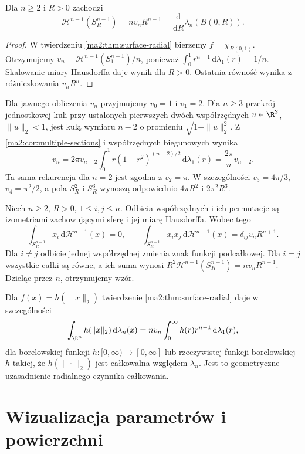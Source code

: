 \begin{wniosek}
\label{ma2:cor:surface-hypersphere}
Dla $n\ge2$ i $R>0$ zachodzi
\[
 \mathcal H^{n-1}(S_R^{n-1})=nv_nR^{n-1}
 =\frac{\mathrm d}{\mathrm dR}\lambda_n(B(0,R)).
\]
\end{wniosek}
\begin{proof}
W twierdzeniu \ref{ma2:thm:surface-radial}
bierzemy $f=\chi_{B(0,1)}$. Otrzymujemy
$v_n=\mathcal H^{n-1}(S_1^{n-1})/n$,
ponieważ $\int_0^1r^{n-1}\,\mathrm d\lambda_1(r)=1/n$.
Skalowanie miary Hausdorffa daje wynik dla $R>0$.
Ostatnia równość wynika z różniczkowania $v_nR^n$.
\end{proof}

Dla jawnego obliczenia $v_n$ przyjmujemy $v_0=1$
i $v_1=2$. Dla $n\ge3$ przekrój jednostkowej kuli
przy ustalonych pierwszych dwóch współrzędnych
$u\in\R^2$, $\|u\|_2<1$, jest kulą wymiaru $n-2$
o promieniu $\sqrt{1-\|u\|_2^2}$.
Z \ref{ma2:cor:multiple-sections} i współrzędnych
biegunowych wynika
\[
 v_n=2\pi v_{n-2}\int_0^1 r(1-r^2)^{(n-2)/2}
 \,\mathrm d\lambda_1(r)=\frac{2\pi}{n}v_{n-2}.
\]
Ta sama rekurencja dla $n=2$ jest zgodna z $v_2=\pi$.
W szczególności $v_3=4\pi/3$, $v_4=\pi^2/2$,
a pola $S_R^2$ i $S_R^3$ wynoszą odpowiednio
$4\pi R^2$ i $2\pi^2R^3$.

\begin{przyklad}
\label{ma2:ex:surface-hypersphere-moments}
Niech $n\ge2$, $R>0$, $1\le i,j\le n$.
Odbicia współrzędnych i ich
permutacje są izometriami zachowującymi sferę
i jej miarę Hausdorffa. Wobec tego
\[
 \int_{S_R^{n-1}} x_i\,\mathrm d\mathcal H^{n-1}(x)=0,
 \qquad
 \int_{S_R^{n-1}} x_ix_j\,\mathrm d\mathcal H^{n-1}(x)
 =\delta_{ij}v_nR^{n+1}.
\]
Dla $i\ne j$ odbicie jednej współrzędnej zmienia
znak funkcji podcałkowej. Dla $i=j$ wszystkie
całki są równe, a ich suma wynosi
$R^2\mathcal H^{n-1}(S_R^{n-1})=nv_nR^{n+1}$.
Dzieląc przez $n$, otrzymujemy wzór.
\end{przyklad}

Dla $f(x)=h(\|x\|_2)$ twierdzenie
\ref{ma2:thm:surface-radial} daje w szczególności
\[
 \int_{\R^n}h(\|x\|_2)\,\mathrm d\lambda_n(x)
 =nv_n\int_0^\infty h(r)r^{n-1}\,\mathrm d\lambda_1(r),
\]
dla borelowskiej funkcji $h:[0,\infty)\to[0,\infty]$
lub rzeczywistej funkcji borelowskiej $h$ takiej,
że $h(\|\cdot\|_2)$ jest całkowalna względem
$\lambda_n$.
Jest to geometryczne uzasadnienie radialnego
czynnika całkowania.

\section{Wizualizacja parametrów i powierzchni}

